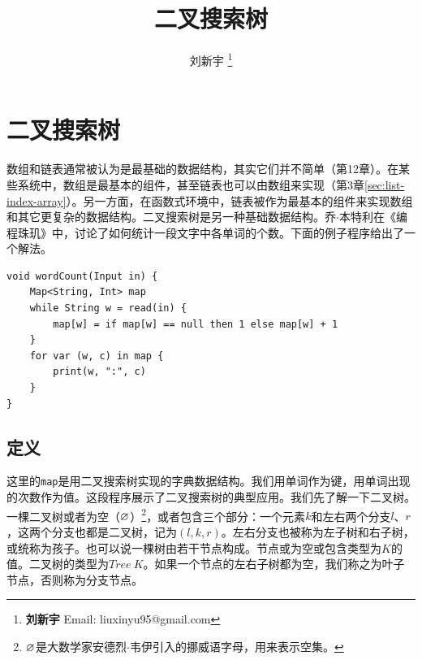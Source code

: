 \documentclass[b5paper]{ctexart}
\begin{document}
\title{二叉搜索树}

\author{刘新宇
\thanks{{\bfseries 刘新宇} \newline
  Email: liuxinyu95@gmail.com \newline}
  }

\maketitle
\fi


\ifx\wholebook\relax
\chapter{二叉搜索树}
\fi

数组和链表通常被认为是最基础的数据结构，其实它们并不简单（第12章）。在某些系统中，数组是最基本的组件，甚至链表也可以由数组来实现（第3章\autoref{sec:list-index-array}）。另一方面，在函数式环境中，链表被作为最基本的组件来实现数组和其它更复杂的数据结构。二叉搜索树是另一种基础数据结构。乔$\cdot$本特利在《编程珠玑》\cite{Bentley}中，讨论了如何统计一段文字中各单词的个数。下面的例子程序给出了一个解法。

\lstset{frame=single}
\begin{lstlisting}[language=Bourbaki]
void wordCount(Input in) {
    Map<String, Int> map
    while String w = read(in) {
        map[w] = if map[w] == null then 1 else map[w] + 1
    }
    for var (w, c) in map {
        print(w, ":", c)
    }
}
\end{lstlisting}



\section{定义}
\label{introduction} 

这里的\texttt{map}是用二叉搜索树实现的字典数据结构。我们用单词作为键，用单词出现的次数作为值。这段程序展示了二叉搜索树的典型应用。我们先了解一下二叉树。一棵二叉树或者为空（$\varnothing$）\footnote{$\varnothing$是大数学家安德烈$\cdot$韦伊引入的挪威语字母，用来表示空集。}，或者包含三个部分：一个元素$k$和左右两个分支$l$、$r$，这两个分支也都是二叉树，记为$(l, k, r)$。左右分支也被称为左子树和右子树，或统称为孩子。也可以说一棵树由若干节点构成。节点或为空或包含类型为$K$的值。二叉树的类型为$Tree\ K$。如果一个节点的左右子树都为空，我们称之为叶子节点，否则称为分支节点。
\end{document}
